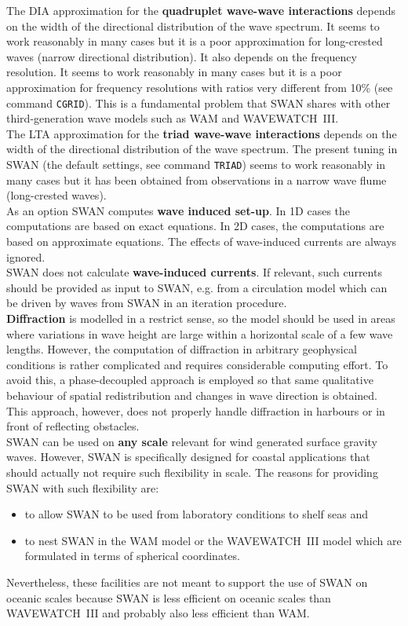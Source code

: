 \documentclass[12pt]{book}
\begin{document}
The DIA approximation for the {\bf quadruplet wave-wave interactions} depends on the width of the directional
distribution of the wave spectrum. It seems to work reasonably in many cases but it is a poor
approximation for long-crested waves (narrow directional distribution). It also depends on the frequency
resolution. It seems to work reasonably in many cases but it is a poor approximation for frequency
resolutions with ratios very different from 10\% (see command {\tt CGRID}). This is a fundamental problem
that SWAN shares with other third-generation wave models such as WAM and WAVEWATCH~III.
\\[2ex]
\noindent
The LTA approximation for the {\bf triad wave-wave interactions} depends on the width of the directional
distribution of the wave spectrum. The present tuning in SWAN (the default settings, see command
{\tt TRIAD}) seems to work reasonably in many cases but it has been obtained from observations in a narrow
wave flume (long-crested waves).
\\[2ex]
\noindent
As an option SWAN computes {\bf wave induced set-up}. In 1D cases the computations are
based on exact equations. In 2D cases, the computations are based on approximate equations. The
effects of wave-induced currents are always ignored.
\\[2ex]
\noindent
SWAN does not calculate {\bf wave-induced currents}. If relevant, such currents should be provided as input
to SWAN, e.g. from a circulation model which can be driven by waves from SWAN in an iteration procedure.
\\[2ex]
\noindent
{\bf Diffraction} is modelled in a restrict sense, so the model should be used in areas where variations in
wave height are large within a horizontal scale of a few wave lengths. However, the computation of diffraction
in arbitrary geophysical conditions is rather complicated and requires considerable computing effort. To
avoid this, a phase-decoupled approach is employed so that same qualitative behaviour of spatial redistribution
and changes in wave direction is obtained.
This approach, however, does not properly handle diffraction in harbours
or in front of reflecting obstacles.
\\[2ex]
\noindent
SWAN can be used on {\bf any scale} relevant for wind generated surface gravity waves. However, SWAN is
specifically designed for coastal applications that should actually not require such flexibility in scale. The
reasons for providing SWAN with such flexibility are:
\begin{itemize}
  \item to allow SWAN to be used from laboratory conditions to shelf seas and
  \item to nest SWAN in the WAM model or the WAVEWATCH~III model which are formulated in terms of
        spherical coordinates.
\end{itemize}
Nevertheless, these facilities are not meant to support the use of SWAN on oceanic scales because
SWAN is less efficient on oceanic scales than WAVEWATCH~III and probably also less efficient than WAM.
\end{document}
